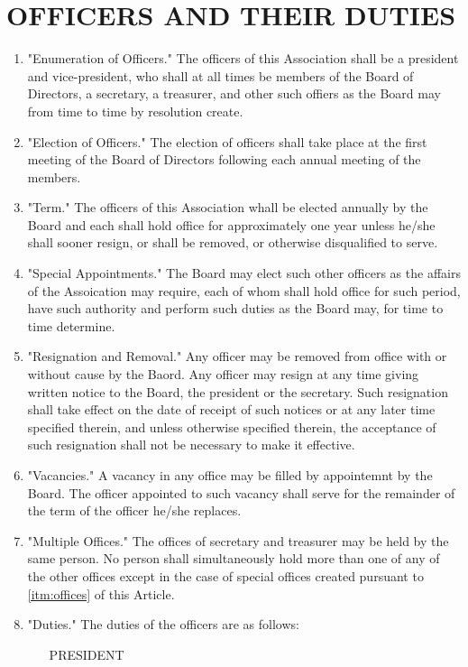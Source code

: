 \documentclass[12pt, letterpaper]{article}
\begin{document}
\section{OFFICERS AND THEIR DUTIES}
\begin{enumerate}
 \item "Enumeration of Officers."
  The officers of this Association shall be a president and vice-president, who shall at all times be members of the Board of Directors, a secretary, a treasurer, and other such offiers as the Board may from time to time by resolution create.
 \item "Election of Officers."
  The election of officers shall take place at the first meeting of the Board of Directors following each annual meeting of the members.
 \item "Term."
  The officers of this Association whall be elected annually by the Board and each shall hold office for approximately one year unless he/she shall sooner resign, or shall be removed, or otherwise disqualified to serve.
 \item "Special Appointments." \label{itm:offices}
  The Board may elect such other officers as the affairs of the Assoication may require, each of whom shall hold office for such period, have such authority and perform such duties as the Board may, for time to time determine.
 \item "Resignation and Removal."
  Any officer may be removed from office with or without cause by the Baord.
  Any officer may resign at any time giving written notice to the Board, the president or the secretary.
  Such resignation shall take effect on the date of receipt of such notices or at any later time specified therein, and unless otherwise specified therein, the acceptance of such resignation shall not be necessary to make it effective.
 \item "Vacancies."
  A vacancy in any office may be filled by appointemnt by the Board.
  The officer appointed to such vacancy shall serve for the remainder of the term of the officer he/she replaces.
 \item "Multiple Offices."
  The offices of secretary and treasurer may be held by the same person.
  No person shall simultaneously hold more than one of any of the other offices except in the case of special offices created pursuant to \ref{itm:offices} of this Article. 
 \item "Duties."
  The duties of the officers are as follows:
  \begin{itemize}
   \item[PRESIDENT]

\end{itemize}
\end{enumerate}
\end{document}
